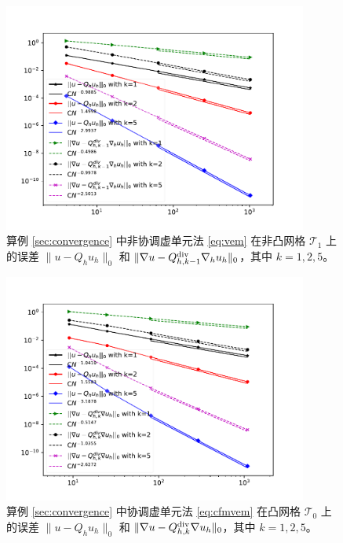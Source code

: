 \begin{figure}[htp]
\centering
\includegraphics[width=10cm]{./figures/stabfree/ncvem_nonconvex.pdf}
\caption{算例 \ref{sec:convergence} 中非协调虚单元法 \eqref{eq:vem} 在非凸网格 $\mathcal T_1$ 上的误差 $\|u - Q_h u_h\|_0$ 和 $\|\nabla u - Q_{h, k-1}^{\operatorname{div}}\nabla_h u_h\|_0$，其中 $k=1,2,5$。}
\label{fig:rate1_nonconvex}
\end{figure}


\begin{figure}[htp]
\centering
\includegraphics[width=10cm]{./figures/stabfree/cvem_convex.pdf}
\caption{算例 \ref{sec:convergence} 中协调虚单元法 \eqref{eq:cfmvem} 在凸网格 $\mathcal T_0$ 上的误差 $\|u - Q_h u_h\|_0$ 和 $\|\nabla u - Q_{h, k}^{\operatorname{div}}\nabla u_h\|_0$，其中 $k=1,2,5$。}
\label{fig:rate2_convex}
\end{figure}

